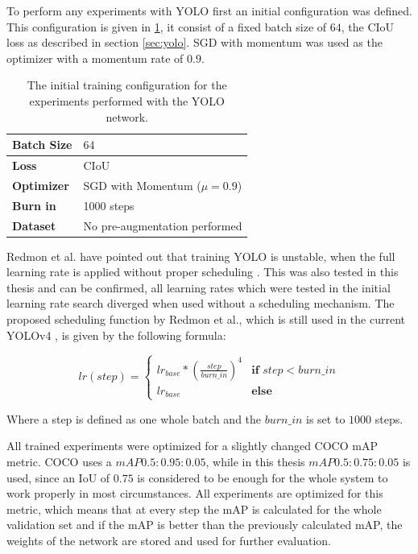 To perform any experiments with \ac{YOLO} first an initial configuration was defined.
This configuration is given in \ref{tab:initial_yolo_config}, it consist of a fixed batch size of $64$, the \ac{CIoU} loss as described in section \ref{sec:yolo}. \ac{SGD} with momentum was used as the optimizer with a momentum rate of $0.9$.

\begin{table}[H]
\footnotesize
\begin{center}
\begin{tabular}{|l|l|}

\hline
\textbf{Batch Size} & $64$\\
\hline
\textbf{Loss} & CIoU \\
\hline
\textbf{Optimizer} & \ac{SGD} with Momentum ($\mu = 0.9$)\\
\hline
\textbf{Burn in} & 1000 steps \\
\hline
\textbf{Dataset} & No pre-augmentation performed \\
\hline

\end{tabular}
\caption{The initial training configuration for the experiments performed with the YOLO network.}
\label{tab:initial_yolo_config}
\end{center}
\end{table}

Redmon et al. have pointed out that training \ac{YOLO} is unstable, when the full learning rate is applied without proper scheduling \cite{yolov2}.
This was also tested in this thesis and can be confirmed, all learning rates which were tested in the initial learning rate search diverged when used without a scheduling mechanism.
The proposed scheduling function by Redmon et al., which is still used in the current \ac{YOLOv4} \cite{yolov4}, is given by the following formula:

\begin{equation}
    lr(step) =
    \begin{cases}
        lr_{base} * (\frac{step}{burn\_in})^4 & \textbf{if } step < burn\_in\\
        lr_{base}                             & \textbf{else}
    \end{cases}
\end{equation}

Where a step is defined as one whole batch and the $burn\_in$ is set to $1000$ steps.

All trained experiments were optimized for a slightly changed COCO mAP metric.
COCO uses a $mAP0.5:0.95:0.05$, while in this thesis $mAP0.5:0.75:0.05$ is used, since an \ac{IoU} of $0.75$ is considered to be enough for the whole system to work properly in most circumstances.
All experiments are optimized for this metric, which means that at every step the mAP is calculated for the whole validation set and if the mAP is better than the previously calculated mAP, the weights of the network are stored and used for further evaluation.


